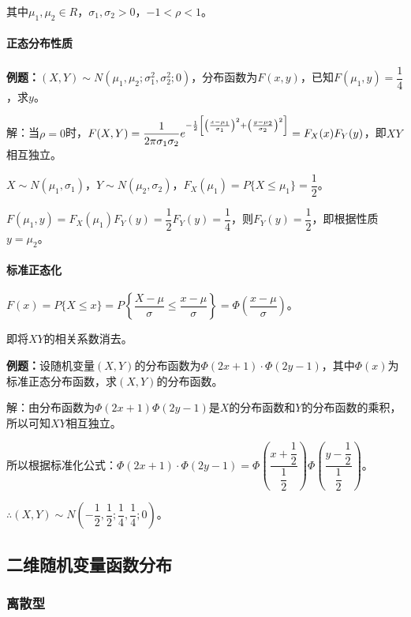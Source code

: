 \documentclass[UTF8, 12pt]{ctexart}
\begin{document}
其中$\mu_1,\mu_2\in R$，$\sigma_1,\sigma_2>0$，$-1<\rho<1$。

\paragraph{正态分布性质} \leavevmode \medskip

\textbf{例题：}$(X,Y)\sim N(\mu_1,\mu_2;\sigma_1^2,\sigma_2^2;0)$，分布函数为$F(x,y)$，已知$F(\mu_1,y)=\dfrac{1}{4}$，求$y$。

解：当$\rho=0$时，$F(X,Y)=\dfrac{1}{2\pi\sigma_1\sigma_2}e^{-\frac{1}{2}\left[\left(\frac{x-\mu_1}{\sigma_1}\right)^2+\left(\frac{y-\mu_2}{\sigma_2}\right)^2\right]}\\=F_X(x)F_Y(y)$，即$XY$相互独立。

$X\sim N(\mu_1,\sigma_1)$，$Y\sim N(\mu_2,\sigma_2)$，$F_X(\mu_1)=P\{X\leqslant\mu_1\}=\dfrac{1}{2}$。

$F(\mu_1,y)=F_X(\mu_1)F_Y(y)=\dfrac{1}{2}F_Y(y)=\dfrac{1}{4}$，则$F_Y(y)=\dfrac{1}{2}$，即根据性质$y=\mu_2$。

\paragraph{标准正态化} \leavevmode \medskip

$F(x)=P\{X\leqslant x\}=P\left\{\dfrac{X-\mu}{\sigma}\leqslant\dfrac{x-\mu}{\sigma}\right\}=\varPhi\left(\dfrac{x-\mu}{\sigma}\right)$。

即将$XY$的相关系数消去。

\textbf{例题：}设随机变量$(X,Y)$的分布函数为$\varPhi(2x+1)\cdot\varPhi(2y-1)$，其中$\varPhi(x)$为标准正态分布函数，求$(X,Y)$的分布函数。

解：由分布函数为$\varPhi(2x+1)\varPhi(2y-1)$是$X$的分布函数和$Y$的分布函数的乘积，所以可知$XY$相互独立。

所以根据标准化公式：$\varPhi(2x+1)\cdot\varPhi(2y-1)=\varPhi\left(\dfrac{x+\dfrac{1}{2}}{\dfrac{1}{2}}\right)\varPhi\left(\dfrac{y-\dfrac{1}{2}}{\dfrac{1}{2}}\right)$。

$\therefore(X,Y)\sim N\left(-\dfrac{1}{2},\dfrac{1}{2};\dfrac{1}{4},\dfrac{1}{4};0\right)$。

\subsection{二维随机变量函数分布}

\subsubsection{离散型}
\end{document}
